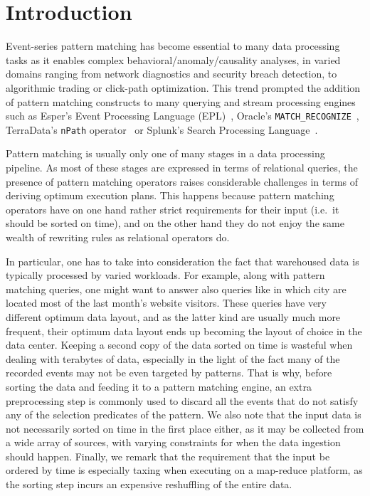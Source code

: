 \section{Introduction}


Event-series pattern matching has become essential to many data processing tasks
as it enables complex 
behavioral\allowbreak /\allowbreak anomaly\allowbreak /\allowbreak causality 
analyses, in varied domains ranging from network diagnostics and security 
breach detection, to algorithmic trading or click-path optimization.
This trend prompted the addition of pattern matching constructs to many 
querying and stream processing engines such as 
Esper's Event Processing Language (EPL)~\cite{esper_epl}, 
Oracle's \texttt{MATCH\_RECOGNIZE}~\cite{oracle_mr}, 
TerraData's \texttt{nPath} operator~\cite{aster_npath} or 
Splunk's Search Processing Language~\cite{Carasso:2012}.



Pattern matching is usually only one of many stages in a data processing 
pipeline. As most of these stages are expressed in terms of relational queries, 
the presence of pattern matching operators raises considerable challenges in 
terms of deriving optimum execution plans. 
This happens because pattern matching operators have on one hand rather strict 
requirements for their input (i.e.\ it should be sorted on time), and on the 
other hand they do not enjoy the same wealth of rewriting rules as relational 
operators do.  

In particular,
one has to take into consideration the fact that
warehoused data is typically processed by varied workloads.
For example, along with pattern matching queries, one might want to answer also 
queries like in which city are located most of the last month's website 
visitors. 
These queries have very different optimum data layout, and as the latter kind 
are usually much more frequent, their optimum data layout ends up becoming the 
layout of choice in the data center.
Keeping a second copy of the data sorted on time is wasteful when dealing with 
terabytes of data, 
especially in the light of the fact many of the recorded events may not be even 
targeted by patterns. 
That is why, before sorting the data and feeding it to a pattern matching 
engine, an extra preprocessing step is commonly used to discard all the events 
that do not satisfy any of the selection predicates of the pattern.     
We also note that the input data is not necessarily sorted on time in the first 
place either, as it may be collected from a wide array of sources, with varying 
constraints for when the data ingestion should happen. 
Finally, we remark that the requirement that the input be ordered by time is 
especially taxing when executing on a map-reduce platform, as the sorting step 
incurs an expensive reshuffling of the entire data. 


